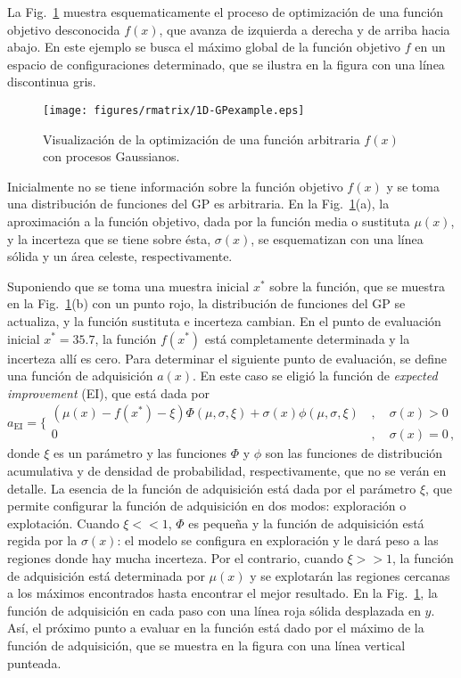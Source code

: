 La Fig.~\ref{fig:visualizacion-gp} muestra esquematicamente el proceso 
de optimización de una función objetivo desconocida $f(x)$, que avanza
de izquierda a derecha y de arriba hacia abajo. En este ejemplo se busca 
el máximo global de la función objetivo $f$ en un espacio de 
configuraciones determinado, que se ilustra en la figura con una línea 
discontinua gris. 

\begin{figure}
\centering
\texttt{[image: figures/rmatrix/1D-GPexample.eps]} 
\caption{Visualización de la optimización de una función arbitraria 
$f(x)$ con procesos Gaussianos.}
\label{fig:visualizacion-gp}
\end{figure}

Inicialmente no se tiene información sobre la función objetivo $f(x)$ y 
se toma una distribución de funciones del GP es arbitraria. En la 
Fig.~\ref{fig:visualizacion-gp}(a), la aproximación a la función 
objetivo, dada por la función media o sustituta $\mu(x)$, y la incerteza 
que se tiene sobre ésta, $\sigma(x)$, se esquematizan con una línea 
sólida y un área celeste, respectivamente. 

Suponiendo que se toma una muestra inicial $x^*$ sobre la función, que 
se muestra en la Fig.~\ref{fig:visualizacion-gp}(b) con un punto rojo,
la distribución de funciones del GP se actualiza, y la función sustituta 
e incerteza cambian. En el punto de evaluación inicial $x^*=35.7$, la 
función $f(x^*)$ está completamente determinada y la incerteza allí es 
cero. Para determinar el siguiente punto de evaluación, se define una 
función de adquisición $a(x)$. En este caso se eligió la función de 
\textit{expected improvement} (EI), 
que está dada por
\begin{equation}
 a_{\mathrm{EI}} = \bigg\{
 \begin{array}{ll}
 (\mu(x)-f(x^*)-\xi)\Phi(\mu,\sigma,\xi) 
 + \sigma(x)\phi(\mu,\sigma,\xi) &\,,\quad\sigma(x)>0\\
 0 &\,,\quad\sigma(x)=0\,,
 \end{array}
\end{equation}
donde $\xi$ es un parámetro y las funciones $\Phi$ y $\phi$ son las 
funciones de distribución acumulativa y de densidad de probabilidad, 
respectivamente, que no se verán en detalle. La esencia de la función 
de adquisición está dada por el parámetro $\xi$, que permite configurar 
la función de adquisición en dos modos: exploración o explotación. 
Cuando $\xi<<1$, $\Phi$ es pequeña y la función de adquisición está 
regida por la $\sigma(x)$: el modelo se configura en exploración y le 
dará peso a las regiones donde hay mucha incerteza. Por el contrario,
cuando $\xi>>1$, la función de adquisición está determinada por $\mu(x)$ 
y se explotarán las regiones cercanas a los máximos encontrados hasta 
encontrar el mejor resultado. En la Fig.~\ref{fig:visualizacion-gp}, la 
función de adquisición en cada paso con una línea roja sólida desplazada
en $y$. Así, el próximo punto a evaluar en la función está dado por el 
máximo de la función de adquisición, que se muestra en la figura con una
línea vertical punteada.

